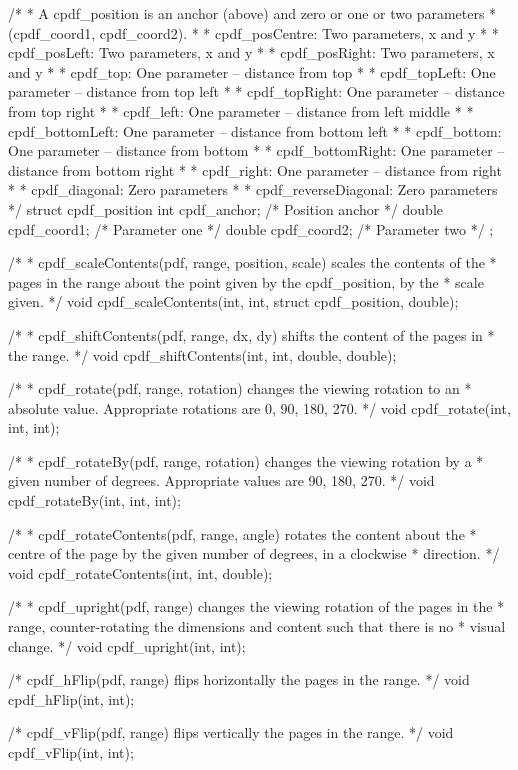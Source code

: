 /*
 * A cpdf_position is an anchor (above) and zero or one or two parameters
 * (cpdf_coord1, cpdf_coord2).
 *
 * cpdf_posCentre: Two parameters, x and y
 *
 * cpdf_posLeft: Two parameters, x and y
 *
 * cpdf_posRight: Two parameters, x and y
 *
 * cpdf_top: One parameter -- distance from top
 *
 * cpdf_topLeft: One parameter -- distance from top left
 *
 * cpdf_topRight: One parameter -- distance from top right
 *
 * cpdf_left: One parameter -- distance from left middle
 *
 * cpdf_bottomLeft: One parameter -- distance from bottom left
 *
 * cpdf_bottom: One parameter -- distance from bottom
 *
 * cpdf_bottomRight: One parameter -- distance from bottom right
 *
 * cpdf_right: One parameter -- distance from right
 *
 * cpdf_diagonal: Zero parameters
 *
 * cpdf_reverseDiagonal: Zero parameters
 */
struct cpdf_position {
  int cpdf_anchor;    /* Position anchor */
  double cpdf_coord1; /* Parameter one */
  double cpdf_coord2; /* Parameter two */
};

/*
 * cpdf_scaleContents(pdf, range, position, scale) scales the contents of the
 * pages in the range about the point given by the cpdf_position, by the
 * scale given.
 */
void cpdf_scaleContents(int, int, struct cpdf_position, double);

/*
 * cpdf_shiftContents(pdf, range, dx, dy) shifts the content of the pages in
 * the range.
 */
void cpdf_shiftContents(int, int, double, double);

/*
 * cpdf_rotate(pdf, range, rotation) changes the viewing rotation to an
 * absolute value. Appropriate rotations are 0, 90, 180, 270.
 */
void cpdf_rotate(int, int, int);

/*
 * cpdf_rotateBy(pdf, range, rotation) changes the viewing rotation by a
 * given number of degrees. Appropriate values are 90, 180, 270.
 */
void cpdf_rotateBy(int, int, int);

/*
 * cpdf_rotateContents(pdf, range, angle) rotates the content about the
 * centre of the page by the given number of degrees, in a clockwise
 * direction.
 */
void cpdf_rotateContents(int, int, double);

/*
 * cpdf_upright(pdf, range) changes the viewing rotation of the pages in the
 * range, counter-rotating the dimensions and content such that there is no
 * visual change.
 */
void cpdf_upright(int, int);

/* cpdf_hFlip(pdf, range) flips horizontally the pages in the range. */
void cpdf_hFlip(int, int);

/* cpdf_vFlip(pdf, range) flips vertically the pages in the range. */
void cpdf_vFlip(int, int);

